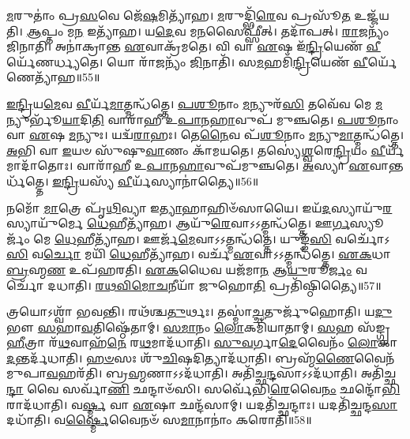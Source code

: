 \-\ul{𑌮}\-𑌰𑍁𑌤𑌾𑌂॑ 𑌪𑍍𑌰\-\ul{𑌸}\-𑌵𑍇 𑌜𑍇᳴\-\ul{𑌷}\-𑌮𑌿𑌤𑍍𑌯𑌾᳴𑌹।
\-\ul{𑌮}\-𑌰𑍁𑌦𑍍𑌭𑌿᳴\-\ul{𑌰𑍇}\-𑌵 𑌪𑍍𑌰𑌸𑍂᳴\-\ul{𑌤} 𑌉𑌜𑍍𑌜᳴𑌯𑌤𑌿।
\-\ul{𑌆}\-𑌪𑍍𑌤𑌂 𑌮\-\ul{𑌨} 𑌇𑌤𑍍𑌯𑌾᳴𑌹।
𑌯\-\ul{𑌦𑍇}\-𑌵 𑌮\-\ul{𑌨}\-𑌸𑍈𑌫𑍍𑌸𑍀॑𑌤𑍍।
𑌤𑌦𑌾᳴𑌪𑌤𑍍।
\-\ul{𑌰𑌾}\-\-\ul{𑌜}\-𑌨𑍍𑌯𑌂᳴ 𑌜𑌿𑌨𑌾𑌤𑌿।
𑌅𑌨𑌾॑𑌕𑍍𑌰𑌾𑌨𑍍𑌤 \ul{𑌏}\-𑌵𑌾𑌕𑍍𑌰᳴𑌮𑌤𑍇।
𑌵𑌿 𑌵𑌾 \ul{𑌏}\-𑌷 𑌇᳴\-\ul{𑌨𑍍𑌦𑍍𑌰𑌿}\-𑌯𑍇𑌣᳴ \ul{𑌵𑍀}\-𑌰𑍍𑌯𑍇᳴𑌣𑌰𑍍𑌧𑍍𑌯𑌤𑍇।
𑌯𑍋 𑌰𑌾᳴\-\ul{𑌜}\-𑌨𑍍𑌯𑌂᳴ \ul{𑌜𑌿}\-𑌨𑌾𑌤𑌿᳴।
𑌸\-\ul{𑌮}\-𑌹𑌮𑌿᳴\-\ul{𑌨𑍍𑌦𑍍𑌰𑌿}\-𑌯𑍇𑌣᳴ \ul{𑌵𑍀}\-𑌰𑍍𑌯𑍇᳴𑌣𑍇𑌤𑍍𑌯𑌾᳴𑌹॥55॥

\-\ul{𑌇}\-\-\ul{𑌨𑍍𑌦𑍍𑌰𑌿}\-𑌯\-\ul{𑌮𑍇}\-𑌵 \ul{𑌵𑍀}\-𑌰𑍍𑌯᳴\-\ul{𑌮𑌾}\-𑌤𑍍𑌮𑌨𑍍𑌧᳴𑌤𑍍𑌤𑍇।
\-\ul{𑌪}\-\-\ul{𑌶𑍂}\-𑌨𑌾𑌂 \ul{𑌮}\-𑌨𑍍𑌯𑍁𑌰᳴\-\ul{𑌸𑌿} 𑌤𑌵𑍇᳴𑌵 𑌮𑍇 \ul{𑌮}\-𑌨𑍍𑌯𑍁𑌰𑍍𑌭𑍂᳴\-\ul{𑌯𑌾}\-𑌦𑌿\-\ul{𑌤𑌿} 𑌵𑌾𑌰𑌾᳴𑌹𑍀 𑌉\-\ul{𑌪𑌾}\-𑌨\-\ul{𑌹𑌾}\-𑌵𑍁𑌪᳴ 𑌮𑍁𑌞𑍍𑌚𑌤𑍇।
\-\ul{𑌪}\-\-\ul{𑌶𑍂}\-𑌨𑌾𑌂 𑌵𑌾 \ul{𑌏}\-𑌷 \ul{𑌮}\-𑌨𑍍𑌯𑍁𑌃।
𑌯𑌦𑍍𑌵᳴\-\ul{𑌰𑌾}\-𑌹𑌃।
𑌤𑍇\-\ul{𑌨𑍈}\-𑌵 𑌪᳴\-\ul{𑌶𑍂}\-𑌨𑌾𑌂 \ul{𑌮}\-𑌨𑍍𑌯𑍁\-\ul{𑌮𑌾}\-𑌤𑍍𑌮𑌨𑍍𑌧᳴𑌤𑍍𑌤𑍇।
\-\ul{𑌅}\-𑌭𑌿 𑌵𑌾 \ul{𑌇}\-𑌯𑍞 𑌸𑍁᳴𑌷𑍁\-\ul{𑌵𑌾}\-𑌣𑌂 𑌕𑌾᳴𑌮𑌯𑌤𑍇।
𑌤𑌸𑍍𑌯𑍇॑\-\ul{𑌶𑍍𑌵}\-𑌰𑍇\-\ul{𑌨𑍍𑌦𑍍𑌰𑌿}\-𑌯𑌂 \ul{𑌵𑍀}\-𑌰𑍍𑌯᳴𑌮𑌾𑌦𑌾᳴𑌤𑍋𑌃।
𑌵𑌾𑌰𑌾᳴𑌹𑍀 𑌉\-\ul{𑌪𑌾}\-𑌨\-\ul{𑌹𑌾}\-𑌵𑍁𑌪᳴𑌮𑍁𑌞𑍍𑌚𑌤𑍇।
\-\ul{𑌅}\-𑌸𑍍𑌯𑌾 \ul{𑌏}\-𑌵𑌾𑌨𑍍𑌤𑌰𑍍𑌧᳴𑌤𑍍𑌤𑍇।
\-\ul{𑌇}\-\-\ul{𑌨𑍍𑌦𑍍𑌰𑌿}\-𑌯𑌸𑍍𑌯᳴ \ul{𑌵𑍀}\-𑌰𑍍𑌯᳴𑌸𑍍𑌯𑌾𑌨𑌾॑𑌤𑍍𑌯𑍈॥56॥

𑌨𑌮𑍋᳴ \ul{𑌮𑌾}\-𑌤𑍍𑌰𑍇 𑌪𑍃᳴\-\ul{𑌥𑌿}\-𑌵𑍍𑌯𑌾 𑌇\-\ul{𑌤𑍍𑌯𑌾}\-𑌹𑌾𑌹𑌿𑍞᳴𑌸𑌾𑌯𑍈।
𑌇𑌯᳴\-\ul{𑌦}\-𑌸𑍍𑌯𑌾𑌯𑍁᳴\-\ul{𑌰}\-𑌸𑍍𑌯𑌾𑌯𑍁᳴𑌰𑍍𑌮𑍇 \ul{𑌧𑍇}\-𑌹𑍀𑌤𑍍𑌯𑌾᳴𑌹।
𑌆𑌯𑍁᳴\-\ul{𑌰𑍇}\-𑌵𑌾𑌽𑌽𑌤𑍍𑌮𑌨𑍍𑌧᳴𑌤𑍍𑌤𑍇।
𑌊\-\ul{𑌰𑍍𑌗}\-𑌸𑍍𑌯𑍂𑌰𑍍𑌜𑌂᳴ 𑌮𑍇 \ul{𑌧𑍇}\-𑌹𑍀𑌤𑍍𑌯𑌾᳴𑌹।
𑌊𑌰𑍍𑌜᳴\-\ul{𑌮𑍇}\-𑌵𑌾𑌽𑌽𑌤𑍍𑌮𑌨𑍍𑌧᳴𑌤𑍍𑌤𑍇।
𑌯𑍁𑌙𑍍𑌙᳴\-\ul{𑌸𑌿} 𑌵𑌰𑍍𑌚𑍋᳴𑌽\-\ul{𑌸𑌿} 𑌵\-\ul{𑌰𑍍𑌚𑍋} 𑌮𑌯𑌿᳴ \ul{𑌧𑍇}\-𑌹𑍀𑌤𑍍𑌯𑌾᳴𑌹।
𑌵𑌰𑍍𑌚᳴ \ul{𑌏}\-𑌵𑌾𑌽𑌽𑌤𑍍𑌮𑌨𑍍𑌧᳴𑌤𑍍𑌤𑍇।
\-\ul{𑌏}\-\-\ul{𑌕}\-𑌧𑌾 \ul{𑌬𑍍𑌰}\-𑌹𑍍𑌮\-\ul{𑌣} 𑌉𑌪᳴𑌹𑌰𑌤𑌿।
\-\ul{𑌏}\-\-\ul{𑌕}\-𑌧𑍈𑌵 𑌯𑌜᳴𑌮𑌾\-\ul{𑌨} 𑌆\-\ul{𑌯𑍁}\-𑌰𑍂\-\ul{𑌰𑍍𑌜𑌂} 𑌵𑌰𑍍𑌚𑍋᳴ 𑌦𑌧𑌾𑌤𑌿।
\-\ul{𑌰}\-\-\ul{𑌥}\-\-\ul{𑌵𑌿}\-\-\ul{𑌮𑍋}\-\-\ul{𑌚}\-𑌨𑍀𑌯𑌾᳴ 𑌜𑍁𑌹𑍋\-\ul{𑌤𑌿} 𑌪𑍍𑌰𑌤𑌿᳴\-𑌷𑍍𑌠𑌿𑌤𑍍𑌯𑍈॥57॥

𑌤𑍍𑌰𑌯𑍋\-𑌽𑌶𑍍𑌵𑌾᳴ 𑌭𑌵𑌨𑍍𑌤𑌿।
𑌰𑌥᳴𑌶𑍍𑌚\-\ul{𑌤𑍁}\-𑌰𑍍𑌥𑌃।
𑌤𑌸𑍍𑌮𑌾॑\-\ul{𑌚𑍍𑌚}\-𑌤𑍁𑌰𑍍𑌜𑍁᳴𑌹𑍋𑌤𑌿।
𑌯\-\ul{𑌦𑍁}\-𑌭𑍗 \ul{𑌸}\-𑌹𑌾\-\ul{𑌵}\-𑌤𑌿𑌷𑍍𑌠𑍇᳴𑌤𑌾𑌮𑍍।
\-\ul{𑌸}\-\-\ul{𑌮𑌾}\-𑌨𑌂 \ul{𑌲𑍋}\-𑌕𑌮𑌿᳴𑌯𑌾𑌤𑌾𑌮𑍍।
\-\ul{𑌸}\-𑌹 𑌸᳴𑌙𑍍𑌗𑍍𑌰\-\ul{𑌹𑍀}\-𑌤𑍍𑌰𑌾 𑌰᳴\-\ul{𑌥}\-𑌵𑌾𑌹᳴\-\ul{𑌨𑍇} 𑌰\-\ul{𑌥}\-𑌮𑌾𑌦᳴𑌧𑌾𑌤𑌿।
\-\ul{𑌸𑍁}\-\-\ul{𑌵}\-𑌰𑍍𑌗𑌾\-\ul{𑌦𑍇}\-𑌵𑍈𑌨𑌂᳴ \ul{𑌲𑍋}\-𑌕𑌾\-\ul{𑌦}\-𑌨𑍍𑌤𑌰𑍍𑌦᳴𑌧𑌾𑌤𑌿।
\-\ul{𑌹}\-\-\ul{𑍞}\-𑌸𑌃 𑌶𑍁᳴\-\ul{𑌚𑌿}\-𑌷𑌦𑌿𑌤𑍍𑌯𑌾𑌦᳴𑌧𑌾𑌤𑌿।
𑌬𑍍𑌰𑌹𑍍𑌮᳴\-\ul{𑌣𑍈}\-𑌵𑍈𑌨᳴𑌮𑍁𑌪𑌾\-\ul{𑌵}\-𑌹𑌰᳴𑌤𑌿।
𑌬𑍍𑌰\-\ul{𑌹𑍍𑌮}\-𑌣𑌾\-𑌽𑌽𑌦᳴𑌧𑌾𑌤𑌿।
𑌅𑌤𑌿᳴𑌚𑍍𑌛\-\ul{𑌨𑍍𑌦}\-𑌸𑌾\-𑌽𑌽𑌦᳴𑌧𑌾𑌤𑌿।
𑌅𑌤𑌿᳴𑌚𑍍𑌛\-\ul{𑌨𑍍𑌦𑌾} 𑌵𑍈 𑌸𑌰𑍍𑌵𑌾᳴\-\ul{𑌣𑌿} 𑌛𑌨𑍍𑌦𑌾𑍞᳴𑌸𑌿।
𑌸𑌰𑍍𑌵𑍇᳴𑌭𑌿\-\ul{𑌰𑍇}\-𑌵𑍈\-\ul{𑌨𑌂} 𑌛𑌨𑍍𑌦𑍋᳴\-\ul{𑌭𑌿}\-𑌰𑌾𑌦᳴𑌧𑌾𑌤𑌿।
𑌵\-\ul{𑌰𑍍𑌷𑍍𑌮} 𑌵𑌾 \ul{𑌏}\-𑌷𑌾 𑌛𑌨𑍍𑌦᳴𑌸𑌾𑌮𑍍।
𑌯𑌦𑌤𑌿᳴𑌚𑍍𑌛𑌨𑍍𑌦𑌾𑌃।
𑌯𑌦𑌤𑌿᳴𑌚𑍍𑌛𑌨𑍍𑌦\-\ul{𑌸𑌾} 𑌦𑌧𑌾᳴𑌤𑌿।
𑌵\-\ul{𑌰𑍍𑌷𑍍𑌮𑍈}\-𑌵𑍈𑌨𑍞᳴ 𑌸\-\ul{𑌮𑌾}\-𑌨𑌾𑌨𑌾𑌂॑ 𑌕𑌰𑍋𑌤𑌿॥58॥\anuvakamend[\-\ul{𑌪}\-\-\ul{𑌦𑍍𑌯}\-\-\ul{𑌨𑍍𑌤𑍇} \ul{𑌦}\-\-\ul{𑌧𑌾}\-\-\ul{𑌤𑌿} \ul{𑌵𑍀}\-𑌰𑍍𑌯𑍇᳴𑌣𑍇\-\ul{𑌤𑍍𑌯𑌾}\-𑌹𑌾𑌨𑌾॑\-\ul{𑌤𑍍𑌯𑍈} 𑌪𑍍𑌰𑌤𑌿᳴\-𑌷𑍍𑌠𑌿\-\ul{𑌤𑍍𑌯𑍈} 𑌬𑍍𑌰\-\ul{𑌹𑍍𑌮}\-𑌣𑌾\-𑌽𑌽𑌦᳴𑌧𑌾𑌤𑌿 \ul{𑌸}\-𑌪𑍍𑌤 𑌚᳴]

